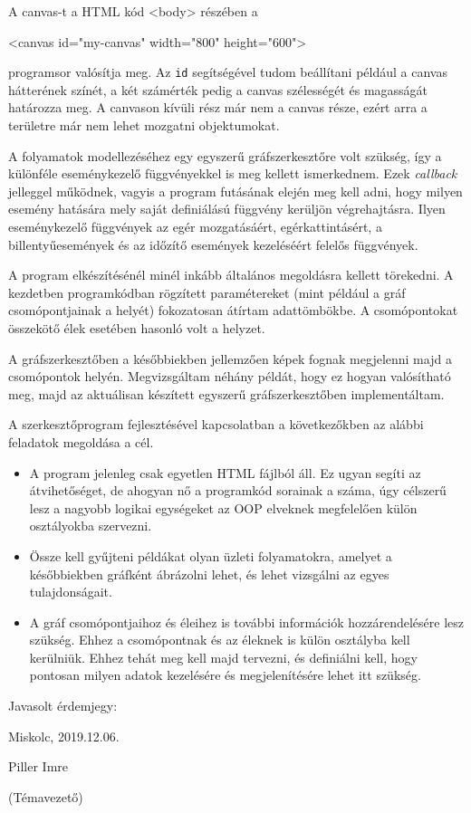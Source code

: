 \documentclass[a4paper]{article}
\begin{document}
A canvas-t a HTML kód <body> részében a
\begin{python}
<canvas id="my-canvas" width="800" height="600">
\end{python}
programsor valósítja meg. Az \texttt{id} segítségével tudom beállítani például a canvas hátterének színét, a két számérték pedig a canvas szélességét és magasságát határozza meg. A canvason kívüli rész már nem a canvas része, ezért arra a területre már nem lehet mozgatni objektumokat.

A folyamatok modellezéséhez egy egyszerű gráfszerkesztőre volt szükség, így a különféle eseménykezelő függvényekkel is meg kellett ismerkednem.
Ezek \textit{callback} jelleggel működnek, vagyis a program futásának elején meg kell adni, hogy milyen esemény hatására mely saját definiálású függvény kerüljön végrehajtásra. Ilyen eseménykezelő függvények az egér mozgatásáért, egérkattintásért, a billentyűesemények és az időzítő események kezeléséért felelős függvények.

A program elkészítésénél minél inkább általános megoldásra kellett törekedni.
A kezdetben programkódban rögzített paramétereket (mint például a gráf csomópontjainak a helyét) fokozatosan átírtam adattömbökbe.
A csomópontokat összekötő élek esetében hasonló volt a helyzet.

A gráfszerkesztőben a későbbiekben jellemzően képek fognak megjelenni majd a csomópontok helyén.
Megvizsgáltam néhány példát, hogy ez hogyan valósítható meg, majd az aktuálisan készített egyszerű gráfszerkesztőben implementáltam.

A szerkesztőprogram fejlesztésével kapcsolatban a következőkben az alábbi feladatok megoldása a cél.
\begin{itemize}
\item A program jelenleg csak egyetlen HTML fájlból áll. Ez ugyan segíti az átvihetőséget, de ahogyan nő a programkód sorainak a száma, úgy célszerű lesz a nagyobb logikai egységeket az OOP elveknek megfelelően külön osztályokba szervezni.
\item Össze kell gyűjteni példákat olyan üzleti folyamatokra, amelyet a későbbiekben gráfként ábrázolni lehet, és lehet vizsgálni az egyes tulajdonságait.
\item A gráf csomópontjaihoz és éleihez is további információk hozzárendelésére lesz szükség. Ehhez a csomópontnak és az éleknek is külön osztályba kell kerülniük. Ehhez tehát meg kell majd tervezni, és definiálni kell, hogy pontosan milyen adatok kezelésére és megjelenítésére lehet itt szükség.
\end{itemize}

\vskip 2cm

\noindent Javasolt érdemjegy:

\vskip 1cm

\noindent Miskolc, 2019.12.06.

\hskip 11.3cm Piller Imre

\hskip 11cm (Témavezető)
\end{document}

